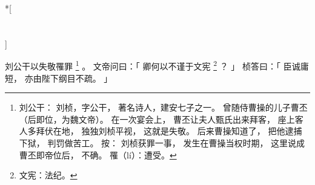 
\switchcolumn[0]*[\section{}]

刘公干以失敬罹罪%
\footnote{%
    刘公干：
        刘桢，字公干，
        著名诗人，建安七子之一。
        曾随侍曹操的儿子曹丕（后即位，为魏文帝）。
        在一次宴会上，
        曹丕让夫人甄氏出来拜客，
        座上客人多拜伏在地，
        独独刘桢平视，
        这就是失敬。
        后来曹操知道了，
        把他逮捕下狱，
        判罚做苦工。
        按：
        刘桢获罪一事，
        发生在曹操当权时期，
        这里说成曹丕即帝位后，
        不确。
    罹（lí）：遭受。
}%
。
文帝问曰：「
    卿何以不谨于文宪%
    \footnote{%
        文宪：法纪。
    }%
    ？
」
桢答曰：「
    臣诚庸短，
    亦由陛下纲目不疏。
」

\switchcolumn



